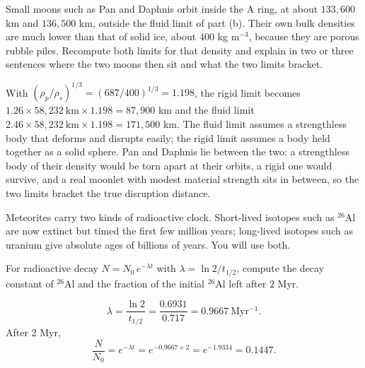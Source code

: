 \parti Small moons such as Pan and Daphnis orbit inside the A ring, at about $133{,}600$ km and $136{,}500$ km, outside the fluid limit of part (b). Their own bulk densities are much lower than that of solid ice, about $400$ kg m$^{-3}$, because they are porous rubble piles. Recompute both limits for that density and explain in two or three sentences where the two moons then sit and what the two limits bracket.

\begin{solution}
With $(\rho_p/\rho_s)^{1/3} = (687/400)^{1/3} = 1.198$, the rigid limit becomes $1.26 \times 58{,}232\ \mathrm{km} \times 1.198 = 87{,}900$ km and the fluid limit $2.46 \times 58{,}232\ \mathrm{km} \times 1.198 = 171{,}500$ km.
The fluid limit assumes a strengthless body that deforms and disrupts easily; the rigid limit assumes a body held together as a solid sphere.
Pan and Daphnis lie between the two: a strengthless body of their density would be torn apart at their orbits, a rigid one would survive, and a real moonlet with modest material strength sits in between, so the two limits bracket the true disruption distance.
\end{solution}



Meteorites carry two kinds of radioactive clock.
Short-lived isotopes such as $^{26}$Al are now extinct but timed the first few million years; long-lived isotopes such as uranium give absolute ages of billions of years.
You will use both.

\parti For radioactive decay $N = N_0\,e^{-\lambda t}$ with $\lambda = \ln 2 / t_{1/2}$, compute the decay constant of $^{26}$Al and the fraction of the initial $^{26}$Al left after $2$ Myr.

\begin{solution}
\[
\lambda = \frac{\ln 2}{t_{1/2}} = \frac{0.6931}{0.717} = 0.9667\ \mathrm{Myr^{-1}}.
\]
After $2$ Myr,
\[
\frac{N}{N_0} = e^{-\lambda t} = e^{-0.9667 \times 2} = e^{-1.9334} = 0.1447.
\]
\end{solution}


